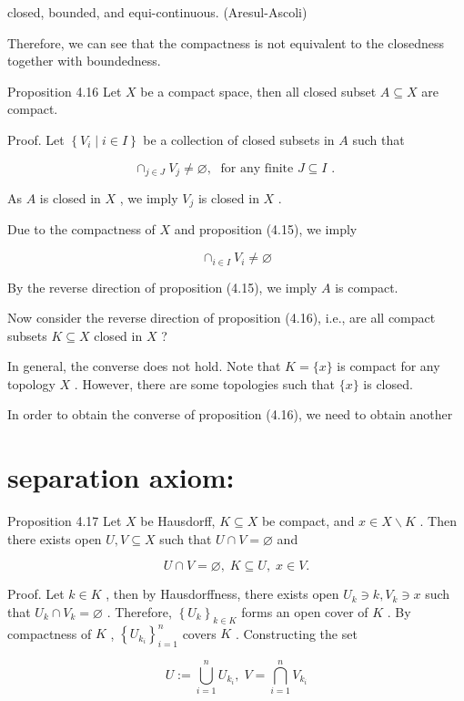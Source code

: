 closed, bounded, and equi-continuous. (Aresul-Ascoli)

Therefore, we can see that the compactness is not equivalent to the closedness together with boundedness.

Proposition 4.16 Let \(X\) be a compact space, then all closed subset \(A \subseteq  X\) are compact.

Proof. Let \(\left\{  {{V}_{i} \mid  i \in  I}\right\}\) be a collection of closed subsets in \(A\) such that

\[
{ \cap  }_{j \in  J}{V}_{j} \neq  \varnothing ,\;\text{ for any finite }J \subseteq  I\text{ . }
\]

As \(A\) is closed in \(X\) , we imply \({V}_{j}\) is closed in \(X\) .

Due to the compactness of \(X\) and proposition (4.15), we imply

\[
{ \cap  }_{i \in  I}{V}_{i} \neq  \varnothing
\]

By the reverse direction of proposition (4.15), we imply \(A\) is compact.

Now consider the reverse direction of proposition (4.16), i.e., are all compact subsets \(K \subseteq  X\) closed in \(X\) ?

In general, the converse does not hold. Note that \(K = \{ x\}\) is compact for any topology \(X\) . However, there are some topologies such that \(\{ x\}\) is closed.

In order to obtain the converse of proposition (4.16), we need to obtain another

\section*{separation axiom:}

Proposition 4.17 Let \(X\) be Hausdorff, \(K \subseteq  X\) be compact, and \(x \in  X \smallsetminus  K\) . Then there exists open \(U,V \subseteq  X\) such that \(U \cap  V = \varnothing\) and

\[
U \cap  V = \varnothing ,\;K \subseteq  U,\;x \in  V.
\]

Proof. Let \(k \in  K\) , then by Hausdorffness, there exists open \({U}_{k} \ni  k,{V}_{k} \ni  x\) such that \({U}_{k} \cap  {V}_{k} = \varnothing\) . Therefore, \({\left\{  {U}_{k}\right\}  }_{k \in  K}\) forms an open cover of \(K\) . By compactness of \(K\) , \({\left\{  {U}_{{k}_{i}}\right\}  }_{i = 1}^{n}\) covers \(K\) . Constructing the set

\[
U \mathrel{\text{ := }} \mathop{\bigcup }\limits_{{i = 1}}^{n}{U}_{{k}_{i}},\;V = \mathop{\bigcap }\limits_{{i = 1}}^{n}{V}_{{k}_{i}}
\]

